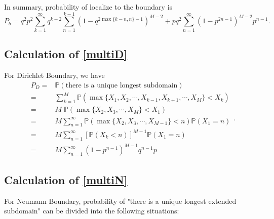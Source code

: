 \documentclass[a4paper,11pt]{article}
\begin{document}
\begin{appendices}
In summary, probability of localize to the boundary is
\begin{equation*}
P_b = q^2 p^2 \sum_{k=1}^{\infty} q^{k-2} \sum_{n=1}^{k-1} (1 - q^{2 \max\{k-n,n\}-1})^{M-2} + p q^2 \sum_{n=1}^{\infty} (1 - p^{2 n-1})^{M-2} p^{n-1}.
\end{equation*}

\subsection{Calculation of \eqref{multiD}}\label{AppendixB2}

For Dirichlet Boundary, we have
\begin{equation*}
\begin{split}
P_D = & \mathbb{P}(\text{there is a unique longest subdomain}) \\
= & \sum_{k=1}^{M} \mathbb{P}(\max\{X_1, X_2, \cdots, X_{k-1}, X_{k+1}, \cdots, X_{M}\} < X_k) \\
= & M \; \mathbb{P}(\max\{X_{2}, X_{3}, \cdots, X_{M}\} < X_1) \\
= & M \sum_{n=1}^{\infty} \mathbb{P}(\max\{X_2, X_3, \cdots, X_{M-1}\} < n) \mathbb{P}(X_1 = n) \\
= & M \sum_{n=1}^{\infty} [\mathbb{P}(X_k < n)]^{M-1} \mathbb{P}(X_1 = n)\\
= & M \sum_{n=1}^{\infty} (1 - p^{n-1})^{M-1} q^{n-1} p
\end{split}.
\end{equation*}

\subsection{Calculation of \eqref{multiN}}\label{AppendixB3}

For Neumann Boundary, probability of "there is a unique longest extended subdomain" can be divided into the following situations:


\end{appendices}
\end{document}
